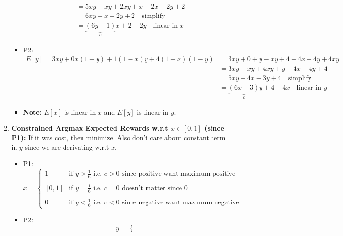 \begin{example}
\begin{enumerate}
\begin{enumerate}
\begin{itemize}
\begin{align*}
                    &= 5xy - xy + 2xy + x - 2x - 2y + 2 \\
                    &= 6xy - x - 2y + 2 \quad \text{simplify} \\
                    &= \underbrace{(6y - 1)}_{c}x + 2 - 2y \quad \text{linear in $x$} 
                \end{align*}
                \item P2:
                \begin{align*}
                    E[y] = 3xy + 0x(1-y) + 1(1-x)y + 4(1-x)(1-y) &= 3xy + 0 + y - xy + 4 - 4x - 4y + 4xy \\
                    &= 3xy - xy + 4xy + y - 4x - 4y + 4 \\
                    &= 6xy - 4x - 3y + 4 \quad \text{simplify} \\
                    &= \underbrace{(6x - 3)}_{c}y + 4 - 4x \quad \text{linear in $y$}
                \end{align*}
                \item \textbf{Note:} $E[x]$ is linear in $x$ and $E[y]$ is linear in $y$.
            \end{itemize}
            \item \textbf{Constrained Argmax Expected Rewards w.r.t $x \in [0,1]$ (since P1):} If it was cost, then minimize. Also don't care about constant term in $y$ since we are derivating w.r.t $x$.
            \begin{itemize}
                \item P1: 
                \begin{equation*}
                    x = \begin{cases}
                        1 & \text{if } y > \frac{1}{6} \text{ i.e. } c > 0 \text{ since positive want maximum positive}\\
                        & \\
                        [0,1] & \text{if } y=\frac{1}{6} \text{ i.e. }c = 0 \text{ doesn't matter since 0} \\
                        & \\
                        0 & \text{if } y < \frac{1}{6} \text{ i.e. } c < 0 \text{ since negative want maximum negative}
                    \end{cases}
                \end{equation*}
                \item P2:
                \begin{equation*}
                    y = \begin{cases}

\end{cases}
\end{equation*}
\end{itemize}
\end{enumerate}
\end{enumerate}
\end{example}

